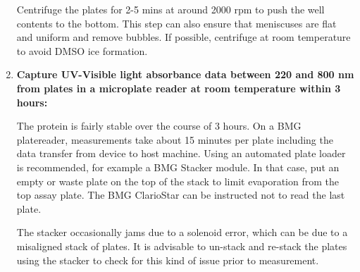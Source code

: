 \documentclass[16pt]{book}
\begin{document}
\begin{enumerate}
	Centrifuge the plates for 2-5 mins at around 2000 rpm to push the well contents to the bottom.
	This step can also ensure that meniscuses are flat and uniform and remove bubbles.
	If possible, centrifuge at room temperature to avoid DMSO ice formation.

\item \textbf{Capture UV-Visible light absorbance data between 220 and 800 nm from plates in a microplate reader at room temperature within 3 hours:}

	The protein is fairly stable over the course of 3 hours.
	On a BMG platereader, measurements take about 15 minutes per plate including the data transfer from device to host machine.
	Using an automated plate loader is recommended, for example a BMG Stacker module.
	In that case, put an empty or waste plate on the top of the stack to limit evaporation from the top assay plate.
	The BMG ClarioStar can be instructed not to read the last plate.

	The stacker occasionally jams due to a solenoid error, which can be due to a misaligned stack of plates.
	It is advisable to un-stack and re-stack the plates using the stacker to check for this kind of issue prior to measurement.


\end{enumerate}
\end{document}
